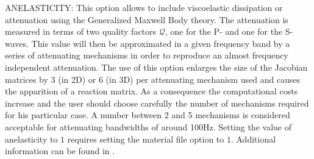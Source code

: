 \documentclass[12pt,twoside]{article}
\def\Q{{\mathcal Q}}
\begin{document}
\noindent
\hypertarget{anelas}{ANELASTICITY}: This option allows to include viscoelastic dissipation or
attenuation using the Generalized Maxwell Body theory.
The attenuation is measured in terms of two quality factors $\Q$, one for the P- and one for the S-waves.
This value will then be approximated in a given frequency band by a series of attenuating mechanisms in order
to reproduce an almost frequency independent attenuation.
The use of this option enlarges the size of the Jacobian matrices by $3$ (in 2D) or $6$ (in 3D) per attenuating
mechanism used and causes the apparition of a reaction matrix.
As a consequence the computational costs increase and the user should choose carefully the number of mechanisms
required for his particular case.
A number between 2 and 5 mechanisms is considered acceptable for attenuating bandwidths of around 100Hz.
Setting the value of anelasticity to $1$ requires setting the material file option to $1$.
Additional information can be found in \cite{KaeserDumbserPuente07}.\\
\end{document}
